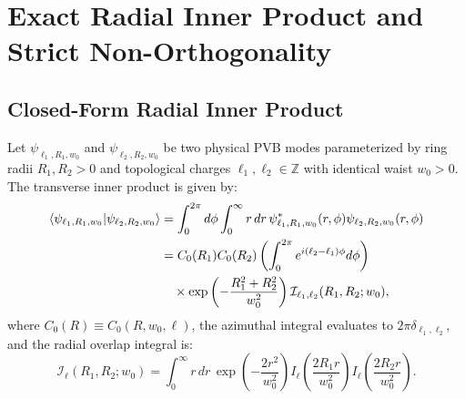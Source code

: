 \documentclass{optica-article}
\begin{document}
\section{Exact Radial Inner Product and Strict Non-Orthogonality}
\label{sec:inner_product}

\subsection{Closed-Form Radial Inner Product}

Let $\psi_{\ell_1, R_1, w_0}$ and $\psi_{\ell_2, R_2, w_0}$ be two physical PVB modes parameterized by ring radii $R_1, R_2 > 0$ and topological charges $\ell_1, \ell_2 \in \mathbb{Z}$ with identical waist $w_0 > 0$. The transverse inner product is given by:
\begin{align}
\langle \psi_{\ell_1, R_1, w_0} | \psi_{\ell_2, R_2, w_0} \rangle &= \int_0^{2\pi} d\phi \int_0^\infty r \, dr \, \psi_{\ell_1, R_1, w_0}^*(r, \phi) \psi_{\ell_2, R_2, w_0}(r, \phi) \notag \\
&= C_0(R_1) C_0(R_2) \left( \int_0^{2\pi} e^{i(\ell_2 - \ell_1)\phi} d\phi \right) \notag \\
&\quad \times \exp\left( - \frac{R_1^2 + R_2^2}{w_0^2} \right) \mathcal{I}_{\ell_1, \ell_2}(R_1, R_2; w_0),
\label{eq:inner_product_setup}
\end{align}
where $C_0(R) \equiv C_0(R, w_0, \ell)$, the azimuthal integral evaluates to $2\pi \delta_{\ell_1, \ell_2}$, and the radial overlap integral is:
\begin{equation}
\mathcal{I}_\ell(R_1, R_2; w_0) = \int_0^\infty r \, dr \, \exp\left( - \frac{2 r^2}{w_0^2} \right) I_\ell\left( \frac{2 R_1 r}{w_0^2} \right) I_\ell\left( \frac{2 R_2 r}{w_0^2} \right).
\label{eq:radial_overlap_integral}
\end{equation}
\end{document}
